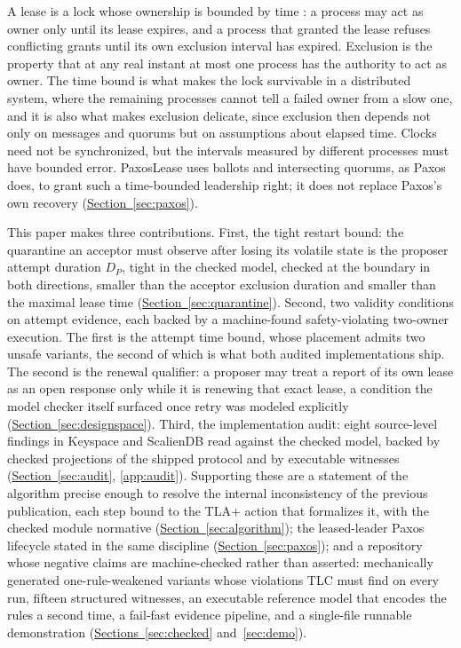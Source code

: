 \documentclass[final,5p,times,twocolumn,number]{elsarticle}
\newcommand{\secref}[1]{\hyperref[#1]{Section~\ref*{#1}}}
\newcommand{\secsref}[2]{\hyperref[#1]{Sections~\ref*{#1}} and~\hyperref[#2]{\ref*{#2}}}
\begin{document}
A lease is a lock whose ownership is bounded by time \cite{ref3}: a process may act as owner only until its lease expires, and a process that granted the lease refuses conflicting grants until its own exclusion interval has expired.  Exclusion is the property that at any real instant at most one process has the authority to act as owner.  The time bound is what makes the lock survivable in a distributed system, where the remaining processes cannot tell a failed owner from a slow one, and it is also what makes exclusion delicate, since exclusion then depends not only on messages and quorums but on assumptions about elapsed time.  Clocks need not be synchronized, but the intervals measured by different processes must have bounded error.  PaxosLease uses ballots and intersecting quorums, as Paxos does, to grant such a time-bounded leadership right; it does not replace Paxos's own recovery (\secref{sec:paxos}).

This paper makes three contributions.  First, the tight restart bound: the quarantine an acceptor must observe after losing its volatile state is the proposer attempt duration $D_P$, tight in the checked model, checked at the boundary in both directions, smaller than the acceptor exclusion duration and smaller than the maximal lease time (\secref{sec:quarantine}).  Second, two validity conditions on attempt evidence, each backed by a machine-found safety-violating two-owner execution.  The first is the attempt time bound, whose placement admits two unsafe variants, the second of which is what both audited implementations ship.  The second is the renewal qualifier: a proposer may treat a report of its own lease as an open response only while it is renewing that exact lease, a condition the model checker itself surfaced once retry was modeled explicitly (\secref{sec:designspace}).  Third, the implementation audit: eight source-level findings in Keyspace and ScalienDB read against the checked model, backed by checked projections of the shipped protocol and by executable witnesses (\secref{sec:audit}, \ref{app:audit}).  Supporting these are a statement of the algorithm precise enough to resolve the internal inconsistency of the previous publication, each step bound to the TLA+ action that formalizes it, with the checked module normative (\secref{sec:algorithm}); the leased-leader Paxos lifecycle stated in the same discipline (\secref{sec:paxos}); and a repository whose negative claims are machine-checked rather than asserted: mechanically generated one-rule-weakened variants whose violations TLC must find on every run, fifteen structured witnesses, an executable reference model that encodes the rules a second time, a fail-fast evidence pipeline, and a single-file runnable demonstration (\secsref{sec:checked}{sec:demo}).
\end{document}
